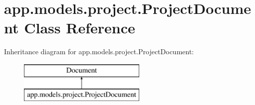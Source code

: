 \hypertarget{classapp_1_1models_1_1project_1_1_project_document}{}\section{app.\+models.\+project.\+Project\+Document Class Reference}
\label{classapp_1_1models_1_1project_1_1_project_document}
Inheritance diagram for app.\+models.\+project.\+Project\+Document\+:\begin{figure}[H]
\begin{center}
\leavevmode
\includegraphics[height=2.000000cm]{classapp_1_1models_1_1project_1_1_project_document}
\end{center}
\end{figure}
